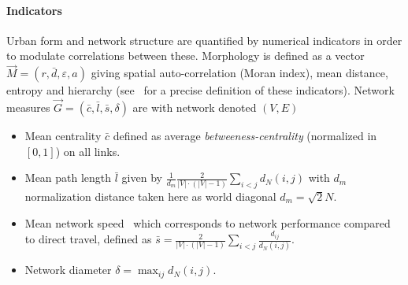 


\paragraph{Indicators}

Urban form and network structure are quantified by numerical indicators in order to modulate correlations between these. Morphology is defined as a vector $\vec{M}=(r,\bar{d},\varepsilon,a)$ giving spatial auto-correlation (Moran index), mean distance, entropy and hierarchy (see~\cite{le2015forme} for a precise definition of these indicators). Network measures $\vec{G} = (\bar{c},\bar{l},\bar{s},\delta)$ are with network denoted $(V,E)$
\begin{itemize}
\item Mean centrality $\bar{c}$ defined as average \emph{betweeness-centrality} (normalized in $[0,1]$) on all links.
\item Mean path length $\bar{l}$ given by $\frac{1}{d_m}\frac{2}{|V|\cdot (|V|-1)}\sum_{i<j}d_N(i,j)$ with $d_m$ normalization distance taken here as world diagonal $d_m=\sqrt{2}N$.
\item Mean network speed~\cite{banos2012towards} which corresponds to network performance compared to direct travel, defined as $\bar{s} = \frac{2}{|V|\cdot (|V|-1)}\sum_{i<j}{\frac{d_{ij}}{d_N(i,j)}}$.
\item Network diameter $\delta = \max_{ij}d_N(i,j)$.
\end{itemize}


